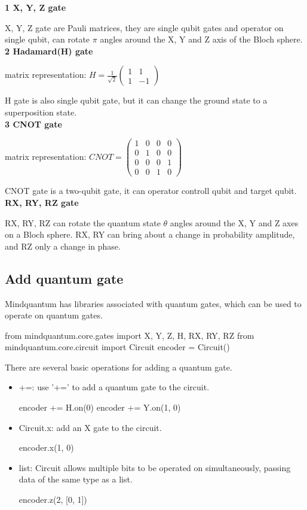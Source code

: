 \textbf{1 X, Y, Z gate}

X, Y, Z gate are Pauli matrices, they are single qubit gates and operator on single qubit, can rotate $\pi$ angles around the X, Y and Z axis of the Bloch sphere.   \\

\textbf{2 Hadamard(H) gate}

matrix representation: $H = \frac{1}{\sqrt{2}} \left( \begin{array}{cc}
     1 & 1 \\
     1 & -1 
\end{array} \right)$  

H gate is also single qubit gate, but it can change the ground state to a superposition state. \\

\textbf{3 CNOT gate}

matrix representation: $CNOT = \left( \begin{array}{cccc}
     1 & 0 & 0 & 0 \\
     0 & 1 & 0 & 0 \\
     0 & 0 & 0 & 1 \\
     0 & 0 & 1 & 0
\end{array} \right)$  

CNOT gate is a two-qubit gate, it can operator controll qubit and target qubit. \\

\textbf{RX, RY, RZ gate}

RX, RY, RZ can rotate the quantum state $\theta$ angles around the X, Y and Z axes on a Bloch sphere. RX, RY can bring about a change in probability amplitude, and RZ only a change in phase.
\subsection{Add quantum gate}
Mindquantum has libraries associated with quantum gates, which can be used to operate on quantum gates. 
\begin{python}
from mindquantum.core.gates import X, Y, Z, H, RX, RY, RZ
from mindquantum.core.circuit import Circuit
encoder = Circuit()
\end{python}
There are several basic operations for adding a quantum gate.
\begin{itemize}
    \item +=: use '+=' to add a quantum gate to the circuit.
    \begin{python}
encoder += H.on(0) 
encoder += Y.on(1, 0) 
    \end{python}
    \item Circuit.x: add an X gate to the circuit.
    \begin{python}
encoder.x(1, 0)
    \end{python}
    \item list: Circuit allows multiple bits to be operated on simultaneously, passing data of the same type as a list.  
    \begin{python}
encoder.z(2, [0, 1])        
    \end{python}
\end{itemize}
